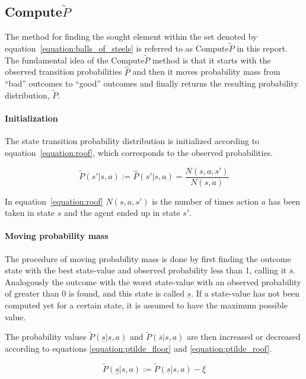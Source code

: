 \subsection{Compute$\tilde{P}$}
\label{sec:ptilde}

The method for finding the sought element within the set denoted by
equation~\eqref{equation:balls_of_steels} is referred to as Compute$\tilde{P}$ in this
report.  The fundamental idea of the Compute$\tilde{P}$ method is that it
starts with the observed transition probabilities $\hat{P}$ and then it moves
probability mass from ``bad'' outcomes to ``good'' outcomes and finally returns
the resulting probability distribution, $\tilde{P}$. 


\paragraph{Initialization} The state transition probability distribution is
initialized according to equation~\eqref{equation:roof}, which corresponds to
the observed probabilities.

\begin{equation}
\label{equation:roof}
\tilde{P}(s'|s, a) := \hat{P}(s'|s, a) = \frac{N(s,a,s')}{N(s,a)}
\end{equation}

In equation~\eqref{equation:roof} $N(s, a, s')$ is the number of times action
$a$ has been taken in state $s$ and the agent ended up in state $s'$.

\paragraph{Moving probability mass}

The procedure of moving probability mass is done by first finding the outcome
state with the best state-value and observed probability less than 1, calling it
$\overline{s}$. Analogously the outcome with the worst state-value with an
observed probability of greater than 0 is found, and this state is called
$\underline{s}$. If a state-value has not been computed yet for a certain state,
it is assumed to have the maximum possible value. 

The probability values $\tilde{P}(\underline{s}|s,a)$ and
$\tilde{P}(\overline{s}|s,a)$ are then increased or decreased according to
equations \eqref{equation:ptilde_floor} and \eqref{equation:ptilde_roof}.

\begin{equation}
\label{equation:ptilde_floor}
\tilde{P}(\underline{s}|s,a) := \tilde{P}(\underline{s}|s,a)-\xi
\end{equation}


